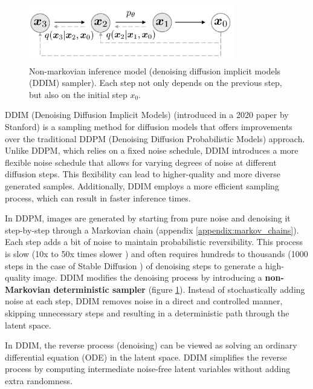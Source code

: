 \begin{figure}
    \centering
    \includegraphics[width=0.8\textwidth]{images/diffusion_models/stable_diffusion/ddim_non_markov_process.png}
    \caption{Non-markovian inference model \cite{ddim} (denoising diffusion implicit models (DDIM) sampler). Each step not only depends on the previous step, but also on the initial step $x_0$.}
    \label{fig:ddim_non_markov_process}
\end{figure}

DDIM (Denoising Diffusion Implicit Models) (introduced in a 2020 paper by Stanford) \cite{ddim} is a sampling method for diffusion models that offers improvements over the traditional DDPM (Denoising Diffusion Probabilistic Models) \cite{ddpm} approach. Unlike DDPM, which relies on a fixed noise schedule, DDIM introduces a more flexible noise schedule that allows for varying degrees of noise at different diffusion steps. This flexibility can lead to higher-quality and more diverse generated samples. Additionally, DDIM employs a more efficient sampling process, which can result in faster inference times.

In DDPM, images are generated by starting from pure noise and denoising it step-by-step through a Markovian chain (appendix \ref{appendix:markov_chains}). Each step adds a bit of noise to maintain probabilistic reversibility. This process is slow (10x to 50x times slower \cite{ddim}) and often requires hundreds to thousands (1000 steps in the case of Stable Diffusion \cite{stable_diffusion}) of denoising steps to generate a high-quality image. DDIM modifies the denoising process by introducing a \textbf{non-Markovian deterministic sampler} (figure \ref{fig:ddim_non_markov_process}). Instead of stochastically adding noise at each step, DDIM removes noise in a direct and controlled manner, skipping unnecessary steps and resulting in a deterministic path through the latent space.

In DDIM, the reverse process (denoising) can be viewed as solving an ordinary differential equation (ODE) in the latent space. DDIM simplifies the reverse process by computing intermediate noise-free latent variables without adding extra randomness.

